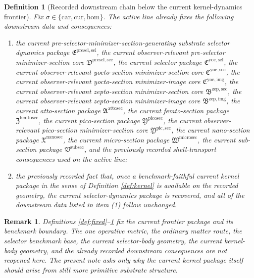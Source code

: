 \documentclass[11pt]{article}
\newcommand{\Car}{\mathrm{car}}
\newcommand{\Cur}{\mathrm{cur}}
\newcommand{\Hom}{\mathrm{hom}}
\newcommand{\SubSectionPackage}{\mathfrak V^{\mathrm{subsec}}}
\newcommand{\MicroSectionPackage}{\mathfrak W^{\mathrm{microsec}}}
\newcommand{\NanoSectionPackage}{\mathfrak X^{\mathrm{nanosec}}}
\newcommand{\PicoSectionPackage}{\mathfrak Y^{\mathrm{picosec}}}
\newcommand{\PicoMinSectionCore}{\mathfrak Y^{\mathrm{pic,sec}}}
\newcommand{\FemtoSectionPackage}{\mathfrak Z^{\mathrm{femtosec}}}
\newcommand{\AttoSectionPackage}{\mathfrak A^{\mathrm{attosec}}}
\newcommand{\ZeptoImageCore}{\mathfrak B^{\mathrm{zep,img}}}
\newcommand{\ZeptoMinSectionCore}{\mathfrak B^{\mathrm{zep,sec}}}
\newcommand{\YoctoImageCore}{\mathfrak C^{\mathrm{yoc,img}}}
\newcommand{\YoctoMinSectionCore}{\mathfrak C^{\mathrm{yoc,sec}}}
\newcommand{\YoctoSelectorPackage}{\mathfrak C^{\mathrm{yoc,sel}}}
\newcommand{\PreSelectorMinSectionCore}{\mathfrak D^{\mathrm{presel,sec}}}
\newcommand{\PreSectionSelectorPackage}{\mathfrak E^{\mathrm{presel,sel}}}
\newtheorem{definition}{Definition}
\newtheorem{remark}{Remark}
\begin{document}
\begin{definition}[Recorded downstream chain below the current kernel-dynamics frontier]
\label{def:downstream}
Fix \(\sigma\in\{\Car,\Cur,\Hom\}\). The active line already fixes the following downstream data and consequences:
\begin{enumerate}
    \item the current pre-selector-minimizer-section-generating substrate selector dynamics package \(\PreSectionSelectorPackage\), the current observer-relevant pre-selector minimizer-section core \(\PreSelectorMinSectionCore\), the current selector package \(\YoctoSelectorPackage\), the current observer-relevant yocto-section minimizer-section core \(\YoctoMinSectionCore\), the current observer-relevant yocto-section minimizer-image core \(\YoctoImageCore\), the current observer-relevant zepto-section minimizer-section core \(\ZeptoMinSectionCore\), the current observer-relevant zepto-section minimizer-image core \(\ZeptoImageCore\), the current atto-section package \(\AttoSectionPackage\), the current femto-section package \(\FemtoSectionPackage\), the current pico-section package \(\PicoSectionPackage\), the current observer-relevant pico-section minimizer-section core \(\PicoMinSectionCore\), the current nano-section package \(\NanoSectionPackage\), the current micro-section package \(\MicroSectionPackage\), the current sub-section package \(\SubSectionPackage\), and the previously recorded shell-transport consequences used on the active line;
    \item the previously recorded fact that, once a benchmark-faithful current kernel package in the sense of Definition \ref{def:kernel} is available on the recorded geometry, the current selector-dynamics package is recovered, and all of the downstream data listed in item (1) follow unchanged.
\end{enumerate}
\end{definition}

\begin{remark}
Definitions \ref{def:fixed}--\ref{def:downstream} fix the current frontier package and its benchmark boundary. The one operative metric, the ordinary matter route, the selector benchmark base, the current selector-body geometry, the current kernel-body geometry, and the already recorded downstream consequences are not reopened here. The present note asks only why the current kernel package itself should arise from still more primitive substrate structure.
\end{remark}
\end{document}

